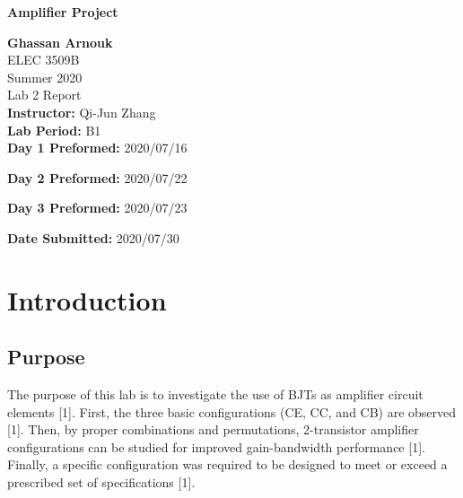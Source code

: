 \documentclass{article}
\begin{document}
	\begin{titlepage}
		\begin{center}
			\vspace{1cm}
			{\LARGE\textbf{Amplifier Project}}
			
			\vspace{1.5cm}
			\textbf{\large Ghassan Arnouk}\\
			
			\vspace{1cm}
			\large ELEC 3509B\\
			\large Summer 2020\\
			\large Lab 2 Report\\
			
			
			\vspace{2cm}
			\textbf{Instructor:} Qi-Jun Zhang\\
			
			
			\vspace{1cm}
			\textbf{Lab Period:} B1\\
			
			\vspace{0.1cm}
			\textbf{Day 1 Preformed:} 2020/07/16
			
			\vspace{0.1cm}
			\textbf{Day 2 Preformed:} 2020/07/22

			\vspace{0.1cm}
			\textbf{Day 3 Preformed:} 2020/07/23
			
			\vspace{1cm}
			\textbf{Date Submitted:} 2020/07/30\\			
		\end{center}
	\end{titlepage}
	
	\pagebreak
	
	\tableofcontents
	\pagebreak
	
	\listoftables
	\pagebreak
	
	\listoffigures
	\pagebreak
	
	\section{Introduction}
	\subsection{Purpose}
	The purpose of this lab is to investigate the use of BJTs as amplifier circuit elements [1].
	First, the three basic configurations (CE, CC, and CB) are observed [1].
	Then, by proper combinations and permutations, 2-transistor amplifier configurations can be studied for improved gain-bandwidth performance [1].
	Finally, a specific configuration was required to be designed to meet or exceed a prescribed set of specifications [1].
	
\end{document}
